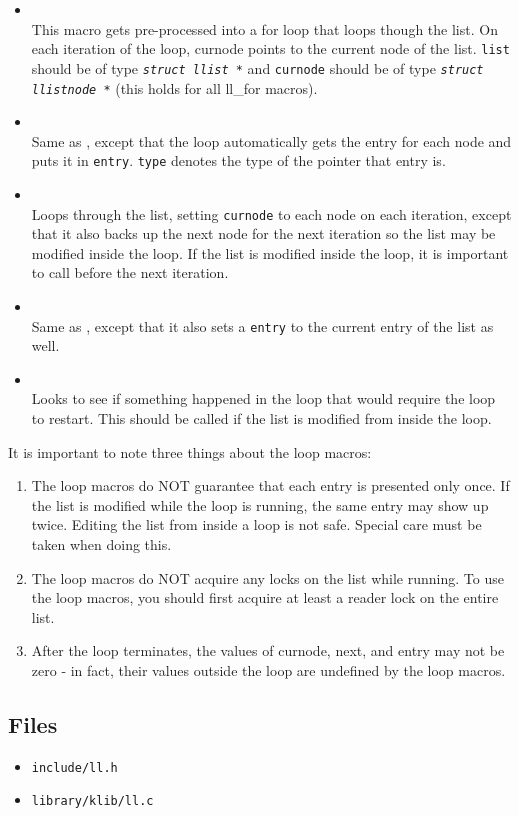 \begin{itemize}
\item {} \\
This macro gets pre-processed into a for loop that loops though the list. On each iteration of the loop,
curnode points to the current node of the list. \texttt{list} should be of type \texttt{\textit{struct llist *}}
and \texttt{curnode} should be of type \texttt{\textit{struct llistnode *}} (this holds for all ll\_for macros).

\item {} \\
Same as , except that the loop automatically gets the entry
for each node and puts it in \texttt{entry}. \texttt{type} denotes the type of the
pointer that entry is.

\item {} \\
Loops through the list, setting \texttt{curnode} to each node on each iteration, except that it
also backs up the next node for the next iteration so the list may be modified inside the loop.
If the list is modified inside the loop, it is important to call  before
the next iteration.

\item {} \\
Same as , except that it also sets a \texttt{entry} to the
current entry of the list as well.

\item {} \\
Looks to see if something happened in the loop that would require the loop to restart. This should be
called if the list is modified from inside the loop.
\end{itemize}

It is important to note three things about the loop macros:
\begin{enumerate}
\item The loop macros do NOT guarantee that each entry is presented only once. If the list is modified
while the loop is running, the same entry may show up twice. Editing the list from inside a loop is not safe.
Special care must be taken when doing this.

\item The loop macros do NOT acquire any locks on the list while running. To use the loop macros, you should
first acquire at least a reader lock on the entire list.

\item After the loop terminates, the values of curnode, next, and entry may not be zero - in fact, 
their values outside the loop are undefined by the loop macros.
\end{enumerate}

\subsection{Files}
\begin{itemize}
\item \texttt{include/ll.h}
\item \texttt{library/klib/ll.c}
\end{itemize}
